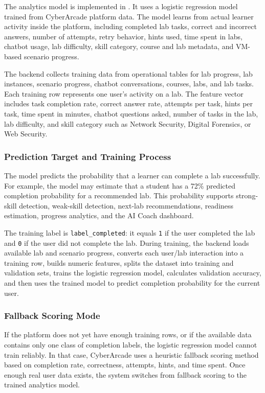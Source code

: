 \documentclass[12pt,a4paper]{report}
\begin{document}
The analytics model is implemented in . It uses a logistic regression model trained from CyberArcade platform data. The model learns from actual learner activity inside the platform, including completed lab tasks, correct and incorrect answers, number of attempts, retry behavior, hints used, time spent in labs, chatbot usage, lab difficulty, skill category, course and lab metadata, and VM-based scenario progress.

The backend collects training data from operational tables for lab progress, lab instances, scenario progress, chatbot conversations, courses, labs, and lab tasks. Each training row represents one user's activity on a lab. The feature vector includes task completion rate, correct answer rate, attempts per task, hints per task, time spent in minutes, chatbot questions asked, number of tasks in the lab, lab difficulty, and skill category such as Network Security, Digital Forensics, or Web Security.

\subsubsection{Prediction Target and Training Process}

The model predicts the probability that a learner can complete a lab successfully. For example, the model may estimate that a student has a 72\% predicted completion probability for a recommended lab. This probability supports strong-skill detection, weak-skill detection, next-lab recommendations, readiness estimation, progress analytics, and the AI Coach dashboard.

The training label is \texttt{label\_completed}: it equals \texttt{1} if the user completed the lab and \texttt{0} if the user did not complete the lab. During training, the backend loads available lab and scenario progress, converts each user/lab interaction into a training row, builds numeric features, splits the dataset into training and validation sets, trains the logistic regression model, calculates validation accuracy, and then uses the trained model to predict completion probability for the current user.

\subsubsection{Fallback Scoring Mode}

If the platform does not yet have enough training rows, or if the available data contains only one class of completion labels, the logistic regression model cannot train reliably. In that case, CyberArcade uses a heuristic fallback scoring method based on completion rate, correctness, attempts, hints, and time spent. Once enough real user data exists, the system switches from fallback scoring to the trained analytics model.
\end{document}
